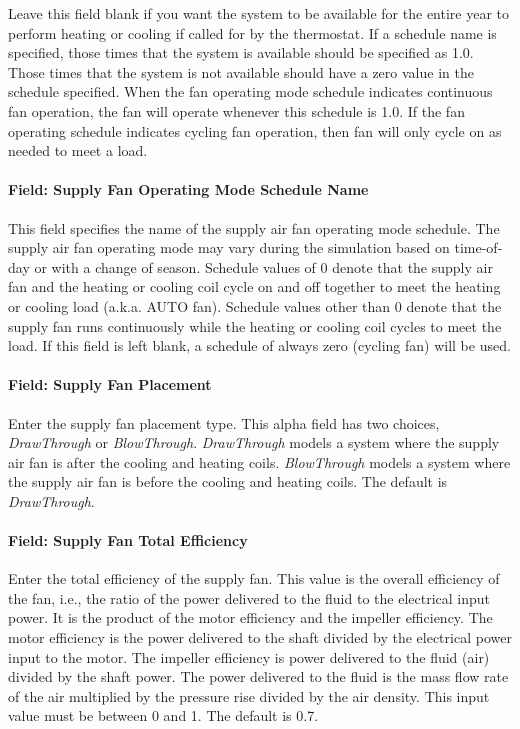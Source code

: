 Leave this field blank if you want the system to be available for the entire year to perform heating or cooling if called for by the thermostat. If a schedule name is specified, those times that the system is available should be specified as 1.0. Those times that the system is not available should have a zero value in the schedule specified. When the fan operating mode schedule indicates continuous fan operation, the fan will operate whenever this schedule is 1.0. If the fan operating schedule indicates cycling fan operation, then fan will only cycle on as needed to meet a load.

\paragraph{Field: Supply Fan Operating Mode Schedule Name}\label{field-supply-fan-operating-mode-schedule-name-1}

This field specifies the name of the supply air fan operating mode schedule. The supply air fan operating mode may vary during the simulation based on time-of-day or with a change of season. Schedule values of 0 denote that the supply air fan and the heating or cooling coil cycle on and off together to meet the heating or cooling load (a.k.a. AUTO fan). Schedule values other than 0 denote that the supply fan runs continuously while the heating or cooling coil cycles to meet the load. If this field is left blank, a schedule of always zero (cycling fan) will be used.

\paragraph{Field: Supply Fan Placement}\label{field-supply-fan-placement-1}

Enter the supply fan placement type. This alpha field has two choices, \emph{DrawThrough} or \emph{BlowThrough}. \emph{DrawThrough} models a system where the supply air fan is after the cooling and heating coils. \emph{BlowThrough} models a system where the supply air fan is before the cooling and heating coils. The default is \emph{DrawThrough}.

\paragraph{Field: Supply Fan Total Efficiency}\label{field-supply-fan-total-efficiency-2}

Enter the total efficiency of the supply fan. This value is the overall efficiency of the fan, i.e., the ratio of the power delivered to the fluid to the electrical input power. It is the product of the motor efficiency and the impeller efficiency. The motor efficiency is the power delivered to the shaft divided by the electrical power input to the motor. The impeller efficiency is power delivered to the fluid (air) divided by the shaft power. The power delivered to the fluid is the mass flow rate of the air multiplied by the pressure rise divided by the air density. This input value must be between 0 and 1. The default is 0.7.

